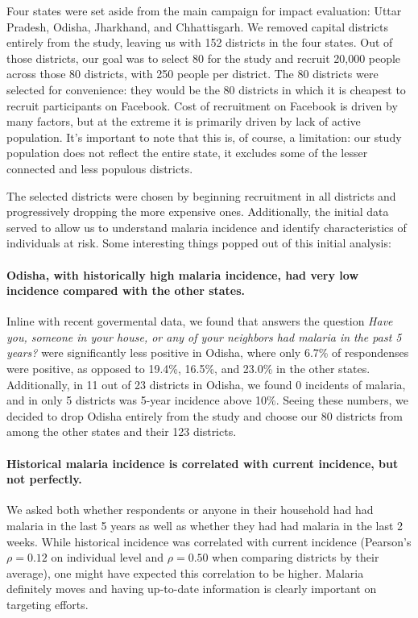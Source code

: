\documentclass[a4paper,12pt]{article}
\begin{document}
Four states were set aside from the main campaign for impact evaluation: Uttar Pradesh, Odisha, Jharkhand, and Chhattisgarh. We removed capital districts entirely from the study, leaving us with 152 districts in the four states. Out of those districts, our goal was to select 80 for the study and recruit 20,000 people across those 80 districts, with 250 people per district. The 80 districts were selected for convenience: they would be the 80 districts in which it is cheapest to recruit participants on Facebook. Cost of recruitment on Facebook is driven  by many factors, but at the extreme it is primarily driven by lack of active population. It's important to note that this is, of course, a limitation: our study population does not reflect the entire state, it excludes some of the lesser connected and less populous districts.



The selected districts were chosen by beginning recruitment in all districts and progressively dropping the more expensive ones. Additionally, the initial data served to allow us to understand malaria incidence and identify characteristics of individuals at risk. Some interesting things popped out of this initial analysis:

\paragraph{Odisha, with historically high malaria incidence, had very low incidence compared with the other states.} Inline with recent govermental data, we found that answers the question \textit{Have you, someone in your house, or any of your neighbors had malaria in the past 5 years?} were significantly less positive in Odisha, where only 6.7\% of respondenses were positive, as opposed to 19.4\%, 16.5\%, and 23.0\% in the other states. Additionally, in 11 out of 23 districts in Odisha, we found 0 incidents of malaria, and in only 5 districts was 5-year incidence above 10\%. Seeing these numbers, we decided to drop Odisha entirely from the study and choose our 80 districts from among the other states and their 123 districts.

\paragraph{Historical malaria incidence is correlated with current incidence, but not perfectly.} We asked both whether respondents or anyone in their household had had malaria in the last 5 years as well as whether they had had malaria in the last 2 weeks. While historical incidence was correlated with current incidence (Pearson's $\rho = 0.12$ on individual level and $\rho = 0.50$ when comparing districts by their average), one might have expected this correlation to be higher. Malaria definitely moves and having up-to-date information is clearly important on targeting efforts.
\end{document}
